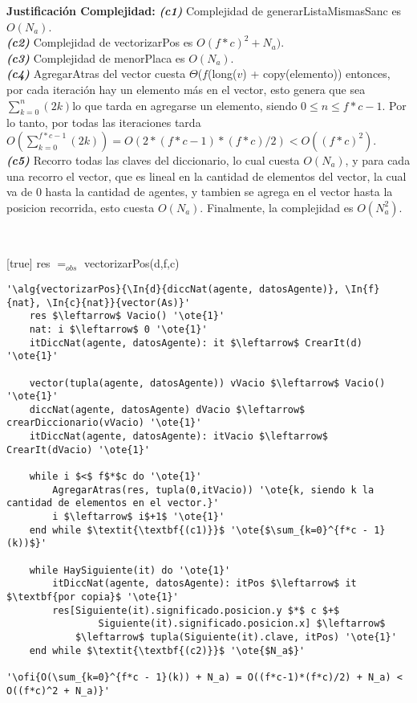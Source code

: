 \textbf{Justificación Complejidad:} \textit{\textbf{(c1)}} Complejidad de generarListaMismasSanc es $O(N_a)$. \\
\textit{\textbf{(c2)}} Complejidad de vectorizarPos es $O(f*c)^2 + N_a)$. \\
\textit{\textbf{(c3)}} Complejidad de menorPlaca es $O(N_a)$. \\
\textit{\textbf{(c4)}} AgregarAtras del vector cuesta $\Theta$($f$(long($v$) + copy(elemento)) entonces, por cada iteración hay un elemento más en el vector, esto genera que sea $\sum_{k=0}^{n}(2k)$lo que tarda en agregarse un elemento, siendo $0\leq n \leq f*c-1$. Por lo tanto, por todas las iteraciones tarda $O(\sum_{k=0}^{f*c - 1}(2k)) = O(2*(f*c-1)*(f*c)/2) < O((f*c)^2)$.\\
\textit{\textbf{(c5)}} Recorro todas las claves del diccionario, lo cual cuesta $O(N_a)$, y para cada una recorro el vector, que es lineal en la cantidad de elementos del vector, la cual va de 0 hasta la cantidad de agentes, y tambien se agrega en el vector hasta la posicion recorrida, esto cuesta $O(N_a)$. Finalmente, la complejidad es $O(N_a^2)$.

~

[true]
{res $=_{obs}$ vectorizarPos(d,f,c)}


\begin{lstlisting}[mathescape]
'\alg{vectorizarPos}{\In{d}{diccNat(agente, datosAgente)}, \In{f}{nat}, \In{c}{nat}}{vector(As)}'
	res $\leftarrow$ Vacio() '\ote{1}'
	nat: i $\leftarrow$ 0 '\ote{1}'
	itDiccNat(agente, datosAgente): it $\leftarrow$ CrearIt(d) '\ote{1}'

	vector(tupla(agente, datosAgente)) vVacio $\leftarrow$ Vacio() '\ote{1}'
	diccNat(agente, datosAgente) dVacio $\leftarrow$ crearDiccionario(vVacio) '\ote{1}'
	itDiccNat(agente, datosAgente): itVacio $\leftarrow$ CrearIt(dVacio) '\ote{1}'

	while i $<$ f$*$c do '\ote{1}'
		AgregarAtras(res, tupla(0,itVacio)) '\ote{k, siendo k la cantidad de elementos en el vector.}'
		i $\leftarrow$ i$+1$ '\ote{1}'
	end while $\textit{\textbf{(c1)}}$ '\ote{$\sum_{k=0}^{f*c - 1}(k))$}'

	while HaySiguiente(it) do '\ote{1}'
		itDiccNat(agente, datosAgente): itPos $\leftarrow$ it $\textbf{por copia}$ '\ote{1}'
		res[Siguiente(it).significado.posicion.y $*$ c $+$
				Siguiente(it).significado.posicion.x] $\leftarrow$
			$\leftarrow$ tupla(Siguiente(it).clave, itPos) '\ote{1}'
	end while $\textit{\textbf{(c2)}}$ '\ote{$N_a$}'

'\ofi{O(\sum_{k=0}^{f*c - 1}(k)) + N_a) = O((f*c-1)*(f*c)/2) + N_a) < O((f*c)^2 + N_a)}'
\end{lstlisting}

